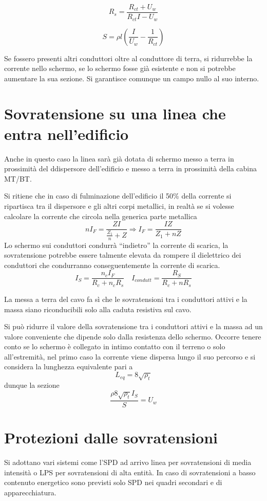 $$
R_s = \frac{R_{ct}+U_w}{R_{ct}I-U_w}
$$

$$
S = \rho l \left(\frac{I}{U_w}- \frac{1}{R_{ct}} \right)
$$

Se fossero presenti altri conduttori oltre al conduttore di terra, si 
ridurrebbe la corrente nello schermo, se lo schermo fosse già esistente e non 
si potrebbe aumentare la sua sezione. Si garantisce comunque un campo nullo al 
suo interno.

\section{Sovratensione su una linea che entra nell'edificio}
Anche in questo caso la linea sarà già dotata di schermo messo a terra in 
prossimità del ddispersore dell'edificio e messo a terra in prossimità della 
cabina MT/BT.

Si ritiene che in caso di fulminazione dell'edificio il 50\% della corrente si ripartisca tra il dispersore e gli altri corpi metallici, in realtà se si volesse calcolare la corrente che circola nella generica parte metallica
$$
nI_F = \frac{ZI}{\frac{Z_1}{n}+Z} \Rightarrow I_F = \frac{IZ}{Z_1+nZ}
$$
Lo schermo sui conduttori condurrà ``indietro'' la corrente di scarica, la 
sovratensione potrebbe essere talmente elevata da rompere il dielettrico dei 
conduttori che condurranno conseguentemente la corrente di scarica.
$$
I_S = \frac{n_cI_F}{R_c + n_cR_s} \quad I_{condutt} = \frac{R_S}{R_c+nR_s}
$$

La messa a terra del cavo fa sì che le sovratensioni tra i conduttori attivi e la massa siano riconducibili solo alla caduta resistiva sul cavo.

Si può ridurre il valore della sovratensione tra i conduttori attivi e la massa ad un valore conveniente che dipende solo dalla resistenza dello schermo. Occorre tenere conto se lo schermo è collegato in intimo contatto con il terreno o solo all'estremità, nel primo caso la corrente viene dispersa lungo il suo percorso e si considera la lunghezza equivalente pari a 
$$
L_{eq} = 8\sqrt{\rho_t}
$$
dunque la sezione
$$
\frac{\rho 8 \sqrt{\rho_t}I_S}{S} = U_w
$$

\section{Protezioni dalle sovratensioni}
Si adottano vari sistemi come l'SPD ad arrivo linea per sovratensioni di media 
intensità o LPS per sovratensioni di alta entità. In caso di sovratensioni a 
basso contenuto energetico sono previsti solo SPD nei quadri secondari e di 
apparecchiatura.

